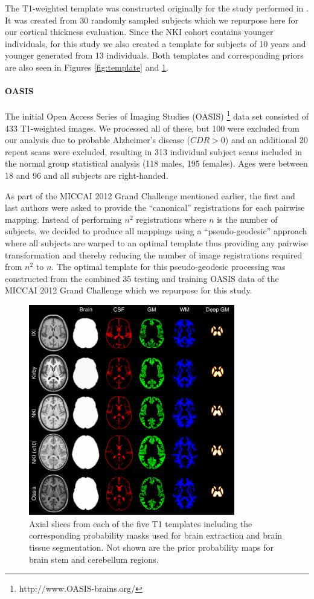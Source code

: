 The T1-weighted template was constructed originally for the study performed
in \cite{tustison2013}.  It was created from 30 randomly sampled subjects 
which we repurpose here for our cortical thickness evaluation.  Since the 
NKI cohort contains younger individuals, for this study we also created a 
template for subjects of 10 years and younger generated from 13 individuals.
Both templates and corresponding priors are also seen in Figures \ref{fig:template} and \ref{fig:templateMasks}.

\paragraph{OASIS}
The initial Open Access Series of Imaging Studies (OASIS)%
\footnote{
http://www.OASIS-brains.org/
}
data set consisted of 433 T1-weighted images.  We processed all of these,
but 100 were excluded from our analysis due to probable Alzheimer's
disease ($CDR > 0$) and an additional 20 repeat scans were excluded,
 resulting in 313 individual subject scans included in the normal group statistical
analysis (118 males, 195 females).  Ages were between 18 and 96 and 
all subjects are right-handed.  

As part of the MICCAI 2012 Grand Challenge mentioned earlier, the first and
last authors were asked to provide the ``canonical'' registrations for each
pairwise mapping.  Instead of performing $n^2$ registrations where $n$ is
the number of subjects, we decided to produce all mappings using a 
``pseudo-geodesic'' approach where all subjects are warped to an optimal
template thus providing any pairwise transformation and thereby 
reducing the number of image registrations required from $n^2$ to $n$.
The optimal template for this pseudo-geodesic processing was constructed 
from the combined 35 testing and training OASIS data of the MICCAI 2012 Grand 
Challenge which we repurpose for this study.

\begin{figure}
  \centering
  \includegraphics[width=90mm]{Figures/templateProbabilityMasks.pdf}
  \caption{Axial slices from each of the five T1 templates including the corresponding
  probability masks used for brain extraction and brain tissue segmentation.  Not shown
  are the prior probability maps for brain stem and cerebellum regions.
  }
  \label{fig:templateMasks}
\end{figure}


